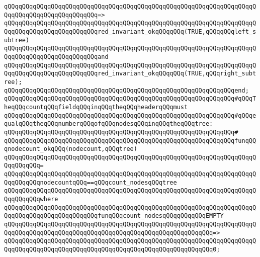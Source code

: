 \verb|qQQqqQQqqQQqqQQqqQQqqQQqqQQqqQQqqQQqqQQqqQQqqQQqqQQqqQQqqQQqqQQqqQQqqQQqqQQqqQQqqQQqqQQqqQQqqQQq=>|\newline
\verb|qQQqqQQqqQQqqQQqqQQqqQQqqQQqqQQqqQQqqQQqqQQqqQQqqQQqqQQqqQQqqQQqqQQqqQQqqQQqqQQqqQQqqQQqqQQqqQQqred_invariant_okqQQqqQQq(TRUE,qQQqqQQqleft_subtree)|\newline
\verb|qQQqqQQqqQQqqQQqqQQqqQQqqQQqqQQqqQQqqQQqqQQqqQQqqQQqqQQqqQQqqQQqqQQqqQQqqQQqqQQqqQQqqQQqqQQqqQQqand|\newline
\verb|qQQqqQQqqQQqqQQqqQQqqQQqqQQqqQQqqQQqqQQqqQQqqQQqqQQqqQQqqQQqqQQqqQQqqQQqqQQqqQQqqQQqqQQqqQQqqQQqred_invariant_okqQQqqQQq(TRUE,qQQqright_subtree);|\newline
\newline
\verb|qQQqqQQqqQQqqQQqqQQqqQQqqQQqqQQqqQQqqQQqqQQqqQQqqQQqqQQqqQQqqQQqend;|\newline
\newline
\verb|qQQqqQQqqQQqqQQqqQQqqQQqqQQqqQQqqQQqqQQqqQQqqQQqqQQqqQQqqQQqqQQq#qQQqTheqQQqcountqQQqfieldqQQqinqQQqtheqQQqheaderqQQqmust|\newline
\verb|qQQqqQQqqQQqqQQqqQQqqQQqqQQqqQQqqQQqqQQqqQQqqQQqqQQqqQQqqQQqqQQq#qQQqequalqQQqtheqQQqnumberqQQqofqQQqnodesqQQqinqQQqtheqQQqtree:|\newline
\verb|qQQqqQQqqQQqqQQqqQQqqQQqqQQqqQQqqQQqqQQqqQQqqQQqqQQqqQQqqQQqqQQq#|\newline
\verb|qQQqqQQqqQQqqQQqqQQqqQQqqQQqqQQqqQQqqQQqqQQqqQQqqQQqqQQqqQQqqQQqfunqQQqnodecount_okqQQq(nodecount,qQQqtree)|\newline
\verb|qQQqqQQqqQQqqQQqqQQqqQQqqQQqqQQqqQQqqQQqqQQqqQQqqQQqqQQqqQQqqQQqqQQqqQQqqQQqqQQq=|\newline
\verb|qQQqqQQqqQQqqQQqqQQqqQQqqQQqqQQqqQQqqQQqqQQqqQQqqQQqqQQqqQQqqQQqqQQqqQQqqQQqqQQqnodecountqQQq==qQQqcount_nodesqQQqtree|\newline
\verb|qQQqqQQqqQQqqQQqqQQqqQQqqQQqqQQqqQQqqQQqqQQqqQQqqQQqqQQqqQQqqQQqqQQqqQQqqQQqqQQqwhere|\newline
\verb|qQQqqQQqqQQqqQQqqQQqqQQqqQQqqQQqqQQqqQQqqQQqqQQqqQQqqQQqqQQqqQQqqQQqqQQqqQQqqQQqqQQqqQQqqQQqqQQqfunqQQqcount_nodesqQQqqQQqqQQqEMPTY|\newline
\verb|qQQqqQQqqQQqqQQqqQQqqQQqqQQqqQQqqQQqqQQqqQQqqQQqqQQqqQQqqQQqqQQqqQQqqQQqqQQqqQQqqQQqqQQqqQQqqQQqqQQqqQQqqQQqqQQqqQQqqQQqqQQqqQQq=>|\newline
\verb|qQQqqQQqqQQqqQQqqQQqqQQqqQQqqQQqqQQqqQQqqQQqqQQqqQQqqQQqqQQqqQQqqQQqqQQqqQQqqQQqqQQqqQQqqQQqqQQqqQQqqQQqqQQqqQQqqQQqqQQqqQQqqQQq0;|\newline
\newline
